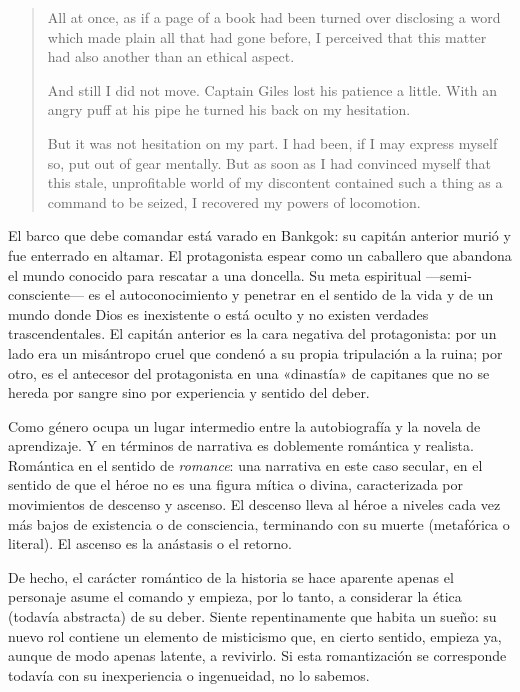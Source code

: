 \documentclass[a4paper, 12pt]{article}
\begin{document}
\begin{quote}
    All at once, as if a page of a book had been turned over disclosing a word
    which made plain all that had gone before, I perceived that this matter had
    also another than an ethical aspect.

And still I did not move. Captain Giles lost his patience a little. With an
angry puff at his pipe he turned his back on my hesitation.

But it was not hesitation on my part. I had been, if I may express myself so,
put out of gear mentally. But as soon as I had convinced myself that this stale,
unprofitable world of my discontent contained such a thing as a command to be
seized, I recovered my powers of locomotion. 
\end{quote}

El barco que debe comandar está varado en Bankgok: su capitán anterior murió y
fue enterrado en altamar. El protagonista espear como un caballero que abandona
el mundo conocido para rescatar a una doncella. Su meta espiritual
---semi-consciente--- es el autoconocimiento y penetrar en el sentido de la vida
y de un mundo donde Dios es inexistente o está oculto y no existen verdades
trascendentales. El capitán anterior es la cara negativa del protagonista: por
un lado era un misántropo cruel que condenó a su propia tripulación a la ruina;
por otro, es el antecesor del protagonista en una «dinastía» de capitanes que no
se hereda por sangre sino por experiencia y sentido del deber. 



Como género ocupa un lugar intermedio entre la autobiografía y la novela de
aprendizaje. Y en términos de narrativa es doblemente romántica y realista.
Romántica en el sentido de \textit{romance}: una narrativa en este caso secular,
en el sentido de que el héroe no es una figura mítica o divina, caracterizada
por movimientos de descenso y ascenso. El descenso lleva al héroe a niveles cada
vez más bajos de existencia o de consciencia, terminando con su muerte
(metafórica o literal). El ascenso es la anástasis o el retorno. 


De hecho, el carácter romántico de la historia se hace aparente apenas el
personaje asume el comando y empieza, por lo tanto, a considerar la ética
(todavía abstracta) de su deber. Siente repentinamente que habita un sueño: su
nuevo rol contiene un elemento de misticismo que, en cierto sentido, empieza ya,
aunque de modo apenas latente, a revivirlo. Si esta romantización se corresponde
todavía con su inexperiencia o ingenueidad, no lo sabemos.
\end{document}
